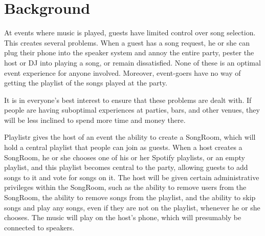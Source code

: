 \documentclass[12pt]{article}
\begin{document}
\pagebreak
\section{Background}

At events where music is played, guests have limited control over song
selection. This creates several problems. When a guest has a song
request, he or she can plug their phone into the speaker system and
annoy the entire party, pester the host or DJ into playing a song, or
remain dissatisfied. None of these is an optimal event experience for
anyone involved. Moreover, event-goers have no way of getting the
playlist of the songs played at the party.

It is in everyone’s best interest to ensure that these problems are
dealt with. If people are having suboptimal experiences at parties,
bars, and other venues, they will be less inclined to spend more time
and money there.

Playlistr gives the host of an event the ability to create a SongRoom,
which will hold a central playlist that people can join as
guests. When a host creates a SongRoom, he or she chooses one of his
or her Spotify playlists, or an empty playlist, and this playlist
becomes central to the party, allowing guests to add songs to it and
vote for songs on it. The host will be given certain administrative
privileges within the SongRoom, such as the ability to remove users
from the SongRoom, the ability to remove songs from the playlist, and
the ability to skip songs and play any songs, even if they are not on
the playlist, whenever he or she chooses. The music will play on the
host’s phone, which will presumably be connected to speakers.
\end{document}
